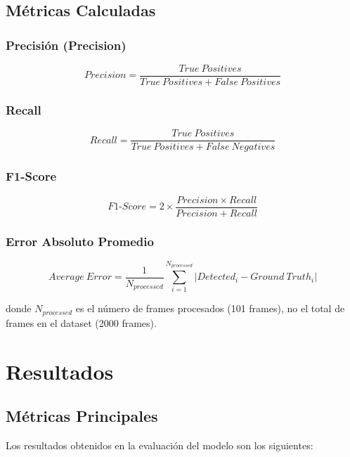 \documentclass[12pt,a4paper]{article}
\begin{document}
\subsection{Métricas Calculadas}

\subsubsection{Precisión (Precision)}
\begin{equation}
Precision = \frac{True\ Positives}{True\ Positives + False\ Positives}
\end{equation}

\subsubsection{Recall}
\begin{equation}
Recall = \frac{True\ Positives}{True\ Positives + False\ Negatives}
\end{equation}

\subsubsection{F1-Score}
\begin{equation}
F1\text{-}Score = 2 \times \frac{Precision \times Recall}{Precision + Recall}
\end{equation}

\subsubsection{Error Absoluto Promedio}
\begin{equation}
Average\ Error = \frac{1}{N_{processed}} \sum_{i=1}^{N_{processed}} |Detected_i - Ground\ Truth_i|
\end{equation}

donde $N_{processed}$ es el número de frames procesados (101 frames), no el total de frames en el dataset (2000 frames).

\section{Resultados}

\subsection{Métricas Principales}

Los resultados obtenidos en la evaluación del modelo son los siguientes:
\end{document}
